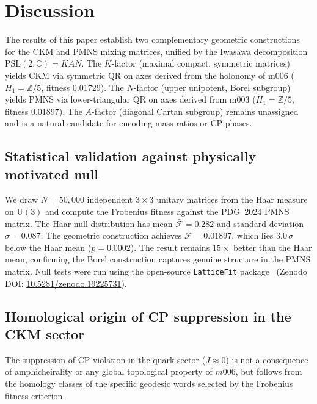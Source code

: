 \documentclass[11pt,a4paper]{article}
\newcommand{\PSL}{\mathrm{PSL}(2,\mathbb{C})}
\begin{document}
\section{Discussion}
\label{sec:discussion}

The results of this paper establish two complementary geometric
constructions for the CKM and PMNS mixing matrices, unified by the
Iwasawa decomposition $\PSL = KAN$.
The $K$-factor (maximal compact, symmetric matrices) yields CKM
via symmetric QR on axes derived from the holonomy of m006
($H_1 = \mathbb{Z}/5$, fitness 0.01729).
The $N$-factor (upper unipotent, Borel subgroup) yields PMNS
via lower-triangular QR on axes derived from m003
($H_1 = \mathbb{Z}/5$, fitness 0.01897).
The $A$-factor (diagonal Cartan subgroup) remains unassigned and
is a natural candidate for encoding mass ratios or CP phases.


\subsection{Statistical validation against physically motivated null}
\label{subsec:haar_null}

We draw $N = 50{,}000$ independent $3\times3$ unitary matrices
from the Haar measure on $\mathrm{U}(3)$ and compute the Frobenius
fitness against the PDG~2024 PMNS matrix.
The Haar null distribution has mean $\bar{\mathcal{F}} = 0.282$
and standard deviation $\sigma = 0.087$.
The geometric construction achieves $\mathcal{F} = 0.01897$,
which lies $3.0\,\sigma$ below the Haar mean ($p = 0.0002$).
The result remains $15\times$ better than the Haar mean, confirming
the Borel construction captures genuine structure in the PMNS matrix.
Null tests were run using the open-source \texttt{LatticeFit} package~\cite{Gentry:LatticeFit} (Zenodo DOI: \href{https://doi.org/10.5281/zenodo.19225731}{10.5281/zenodo.19225731}).



\subsection{Homological origin of CP suppression in the CKM sector}
\label{subsec:homological_cp}

The suppression of CP violation in the quark sector ($J \approx 0$) is not
a consequence of amphicheirality or any global topological property of $m006$,
but follows from the homology classes of the specific geodesic words
selected by the Frobenius fitness criterion.
\end{document}
